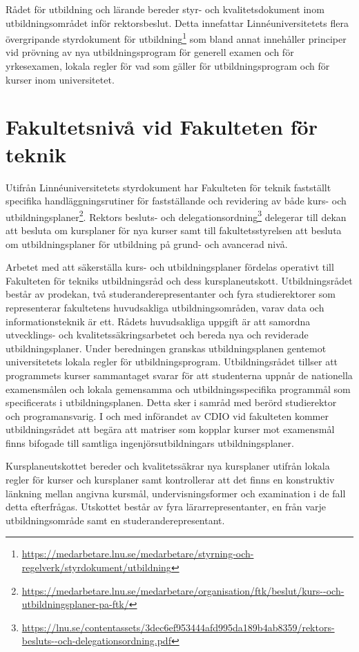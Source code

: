 Rådet för utbildning och lärande bereder styr- och kvalitetsdokument inom utbildningsområdet inför rektorsbeslut. Detta innefattar Linnéuniversitetets flera övergripande styrdokument för utbildning\footnote{\url{https://medarbetare.lnu.se/medarbetare/styrning-och-regelverk/styrdokument/utbildning}} som bland annat innehåller principer vid prövning av nya utbildningsprogram för generell examen och för yrkesexamen, lokala regler för vad som gäller för utbildningsprogram och för kurser inom universitetet.

\section{Fakultetsnivå vid Fakulteten för teknik}

Utifrån Linnéuniversitetets styrdokument har Fakulteten för teknik fastställt specifika handläggningsrutiner för fastställande och revidering av både kurs- och utbildningsplaner\footnote{\url{https://medarbetare.lnu.se/medarbetare/organisation/ftk/beslut/kurs--och-utbildningsplaner-pa-ftk/}}. Rektors besluts- och delegationsordning\footnote{\url{https://lnu.se/contentassets/3dec6ef953444afd995da189b4ab8359/rektors-besluts--och-delegationsordning.pdf}} delegerar till dekan att besluta om kursplaner för nya kurser samt till fakultetsstyrelsen att besluta om utbildningsplaner för utbildning på grund- och avancerad nivå.

Arbetet med att säkerställa kurs- och utbildningsplaner fördelas operativt till Fakulteten för tekniks utbildningsråd och dess kursplaneutskott. Utbildningsrådet består av prodekan, två studeranderepresentanter och fyra studierektorer som representerar fakultetens huvudsakliga utbildningsområden, varav data och informationsteknik är ett. Rådets huvudsakliga uppgift är att samordna utvecklings- och kvalitetssäkringsarbetet och bereda nya och reviderade utbildningsplaner. Under beredningen granskas utbildningsplanen gentemot universitetets lokala regler för utbildningsprogram. Utbildningsrådet tillser att programmets kurser sammantaget svarar för att studenterna uppnår de nationella examensmålen och lokala gemensamma och utbildningsspecifika programmål som specificerats i utbildningsplanen. Detta sker i samråd med berörd studierektor och programansvarig. I och med införandet av CDIO vid fakulteten kommer utbildningsrådet att begära att matriser som kopplar kurser mot examensmål finns bifogade till samtliga ingenjörsutbildningars utbildningsplaner.

Kursplaneutskottet bereder och kvalitetssäkrar nya kursplaner utifrån lokala regler för kurser och kursplaner samt kontrollerar att det finns en konstruktiv länkning mellan angivna kursmål, undervisningsformer och examination i de fall detta efterfrågas. Utskottet består av fyra lärarrepresentanter, en från varje utbildningsområde samt en studeranderepresentant.

